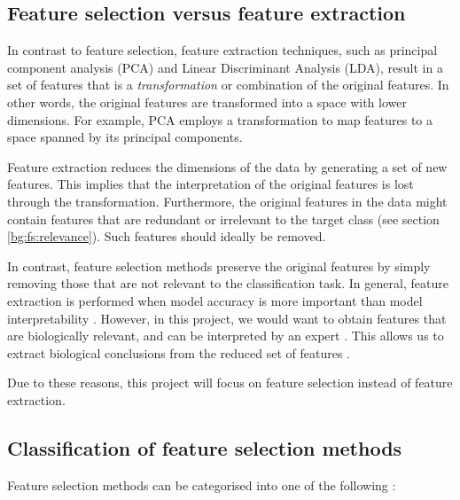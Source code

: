 \documentclass[12pt, twoside, a4paper]{report}
\begin{document}
\subsection{Feature selection versus feature extraction} \label{bg:fs:extraction}

In contrast to feature selection, feature extraction techniques, such as principal component analysis (PCA) and Linear Discriminant Analysis (LDA), result in a set of features that is a \textit{transformation} or combination of the original features. In other words, the original features are transformed into a space with lower dimensions. For example, PCA employs a transformation to map features to a space spanned by its principal components.

Feature extraction reduces the dimensions of the data by generating a set of new features. This implies that the interpretation of the original features is lost through the transformation. Furthermore, the original features in the data might contain features that are redundant or irrelevant to the target class (see section \ref{bg:fs:relevance}). Such features should ideally be removed.

In contrast, feature selection methods preserve the original features by simply removing those that are not relevant to the classification task. In general, feature extraction is performed when model accuracy is more important than model interpretability \cite{RefWorks:163}. However, in this project, we would want to obtain features that are biologically relevant, and can be interpreted by an expert \cite{RefWorks:192}. This allows us to extract biological conclusions from the reduced set of features \cite{RefWorks:142}.

Due to these reasons, this project will focus on feature selection instead of feature extraction.

\subsection{Classification of feature selection methods} \label{bg:fs:classification}

Feature selection methods can be categorised into one of the following \cite{RefWorks:117, RefWorks:118}:
\end{document}
